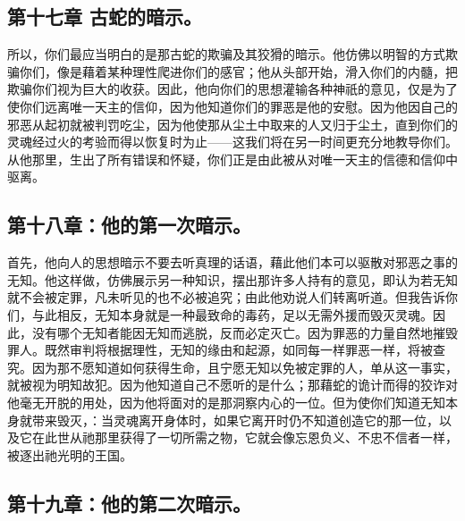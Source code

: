 
\subsection{第十七章 古蛇的暗示。}

所以，你们最应当明白的是那古蛇的欺骗及其狡猾的暗示。他仿佛以明智的方式欺骗你们，像是藉着某种理性爬进你们的感官；他从头部开始，滑入你们的内髓，把欺骗你们视为巨大的收获。因此，他向你们的思想灌输各种神祇的意见，仅是为了使你们远离唯一天主的信仰，因为他知道你们的罪恶是他的安慰。因为他因自己的邪恶从起初就被判罚吃尘，因为他使那从尘土中取来的人又归于尘土，直到你们的灵魂经过火的考验而得以恢复时为止——这我们将在另一时间更充分地教导你们。从他那里，生出了所有错误和怀疑，你们正是由此被从对唯一天主的信德和信仰中驱离。\par


\subsection{第十八章：他的第一次暗示。}

首先，他向人的思想暗示不要去听真理的话语，藉此他们本可以驱散对邪恶之事的无知。他这样做，仿佛展示另一种知识，摆出那许多人持有的意见，即认为若无知就不会被定罪，凡未听见的也不必被追究；由此他劝说人们转离听道。但我告诉你们，与此相反，无知本身就是一种最致命的毒药，足以无需外援而毁灭灵魂。因此，没有哪个无知者能因无知而逃脱，反而必定灭亡。因为罪恶的力量自然地摧毁罪人。既然审判将根据理性，无知的缘由和起源，如同每一样罪恶一样，将被查究。因为那不愿知道如何获得生命，且宁愿无知以免被定罪的人，单从这一事实，就被视为明知故犯。因为他知道自己不愿听的是什么；那藉蛇的诡计而得的狡诈对他毫无开脱的用处，因为他将面对的是那洞察内心的一位。但为使你们知道无知本身就带来毁灭，：当灵魂离开身体时，如果它离开时仍不知道创造它的那一位，以及它在此世从祂那里获得了一切所需之物，它就会像忘恩负义、不忠不信者一样，被逐出祂光明的王国。\par


\subsection{第十九章：他的第二次暗示。}

